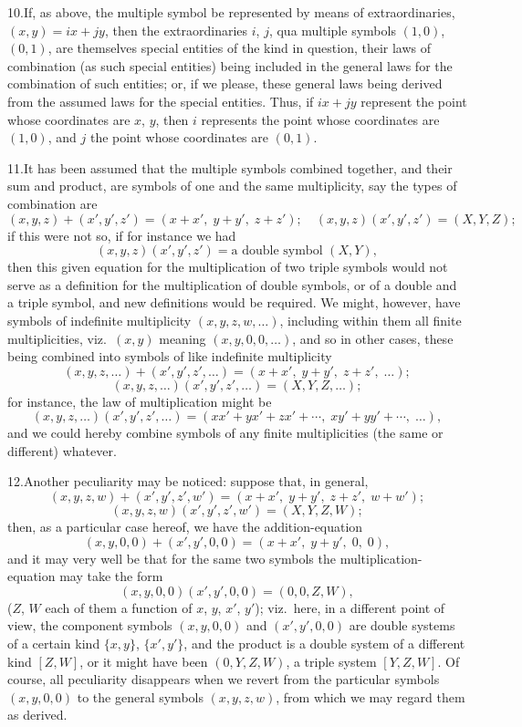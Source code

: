 \documentclass[11pt]{article}
\begin{document}
10.\quad If, as above, the multiple symbol be represented by means of extraordinaries, $(x, y) = ix + jy$, then the extraordinaries $i$, $j$, qua multiple symbols $(1, 0)$, $(0, 1)$, are themselves special entities of the kind in question, their laws of combination (as such special entities) being included in the general laws for the combination of such entities; or, if we please, these general laws being derived from the assumed laws for the special entities. Thus, if $ix + jy$ represent the point whose coordinates are $x$, $y$, then $i$ represents the point whose coordinates are $(1, 0)$, and $j$ the point whose coordinates are $(0, 1)$.

11.\quad It has been assumed that the multiple symbols combined together, and their sum and product, are symbols of one and the same multiplicity, say the types of combination are
\[
(x, y, z) + (x', y', z') = (x + x',\; y + y',\; z + z');\quad (x, y, z)(x', y', z') = (X, Y, Z);
\]
if this were not so, if for instance we had
\[
(x, y, z)(x', y', z') = \text{a double symbol } (X, Y),
\]
then this given equation for the multiplication of two triple symbols would not serve as a definition for the multiplication of double symbols, or of a double and a triple symbol, and new definitions would be required. We might, however, have symbols of indefinite multiplicity $(x, y, z, w, \ldots)$, including within them all finite multiplicities, viz.\ $(x, y)$ meaning $(x, y, 0, 0, \ldots)$, and so in other cases, these being combined into symbols of like indefinite multiplicity
\[
(x, y, z, \ldots) + (x', y', z', \ldots) = (x + x',\; y + y',\; z + z',\; \ldots);
\]
\[
(x, y, z, \ldots)(x', y', z', \ldots) = (X, Y, Z, \ldots);
\]
for instance, the law of multiplication might be
\[
(x, y, z, \ldots)(x', y', z', \ldots) = (xx' + yx' + zx' + \cdots,\; xy' + yy' + \cdots,\; \ldots),
\]
and we could hereby combine symbols of any finite multiplicities (the same or different) whatever.

12.\quad Another peculiarity may be noticed: suppose that, in general,
\[
(x, y, z, w) + (x', y', z', w') = (x + x',\; y + y',\; z + z',\; w + w');
\]
\[
(x, y, z, w)(x', y', z', w') = (X, Y, Z, W);
\]
then, as a particular case hereof, we have the addition-equation
\[
(x, y, 0, 0) + (x', y', 0, 0) = (x + x',\; y + y',\; 0,\; 0),
\]
and it may very well be that for the same two symbols the multiplication-equation may take the form
\[
(x, y, 0, 0)(x', y', 0, 0) = (0, 0, Z, W),
\]
($Z$, $W$ each of them a function of $x$, $y$, $x'$, $y'$); viz.\ here, in a different point of view, the component symbols $(x, y, 0, 0)$ and $(x', y', 0, 0)$ are double systems of a certain kind $\{x, y\}$, $\{x', y'\}$, and the product is a double system of a different kind $[Z, W]$, or it might have been $(0, Y, Z, W)$, a triple system $[Y, Z, W]$. Of course, all peculiarity disappears when we revert from the particular symbols $(x, y, 0, 0)$ to the general symbols $(x, y, z, w)$, from which we may regard them as derived.
\end{document}
